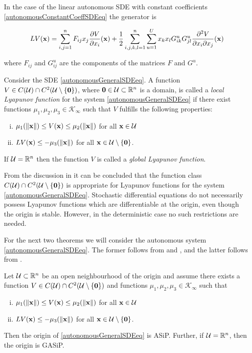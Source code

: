 \documentclass[a4paper,12pt,twoside,BCOR=10mm]{scrbook}
\begin{document}
In the case of the linear autonomous SDE with constant coefficients \eqref{autonomousConstantCoeffSDEeq} the generator is

\begin{align}
    LV(\mathbf{x}) = \sum\limits_{i,j = 1}^nF_{ij}x_j\frac{\partial V}{\partial x_i}(\mathbf{x}) + \frac{1}{2}\sum\limits_{i,j,k,l = 1}^n\sum\limits_{u = 1}^Ux_k x_l G_{ik}^u G_{jl}^u \frac{\partial^2 V}{\partial x_i \partial x_j}(\mathbf{x})
\end{align}

where $F_{ij}$ and $G_{ij}^u$ are the components of the matrices $F$ and $G^u$.

\begin{definition}
    Consider the SDE \eqref{autonomousGeneralSDEeq}. A function $V\in C(\mathcal{U})\cap C^2(\mathcal{U}\setminus \{\mathbf{0}\})$, where $\mathbf{0} \in \mathcal{U} \subset \mathbb{R}^{n}$ is a domain, is called a \textit{local Lyapunov function} for the system \eqref{autonomousGeneralSDEeq} if there exist functions $\mu_1, \mu_2, \mu_3 \in \mathcal{K}_\infty$ such that $V$ fulfills the following properties:
    \begin{enumerate}[i)]
        \item $\mu_1(\left\lVert\mathbf{x}\right\rVert) \leq V(\mathbf{x}) \leq \mu_2(\left\lVert\mathbf{x}\right\rVert)$ for all $\mathbf{x}\in \mathcal{U}$
        \item $LV(\mathbf{x}) \leq -\mu_3(\left\lVert\mathbf{x}\right\rVert)$ for all $\mathbf{x} \in \mathcal{U}\setminus \{\mathbf{0}\}$.
    \end{enumerate}
    If $\mathcal{U} = \mathbb{R}^{n}$ then the function $V$ is called a \textit{global Lyapunov function}.
\end{definition}

From the discussion in \citep[p. 146]{sdestab2012khaminskii} it can be concluded that the function class $C(\mathcal{U})\cap C^2(\mathcal{U}\setminus \{\mathbf{0}\})$ is appropriate for Lyapunov functions for the system \eqref{autonomousGeneralSDEeq}. Stochastic differential equations do not necessarily possess Lyapunov functions which are differentiable at the origin, even though the origin is stable. However, in the deterministic case no such restrictions are needed.
 
For the next two theorems we will consider the autonomous system \eqref{autonomousGeneralSDEeq}. The former follows from \citep[Corollary 5.11]{sdestab2012khaminskii} and \citep[Theorem 5.8]{sdestab2012khaminskii}, and the latter follows from \citep[Theorem 5.11]{sdestab2012khaminskii}.

\begin{theorem}
Let $\mathcal{U} \subset \mathbb{R}^{n}$ be an open neighbourhood of the origin and assume there exists a function $V\in C(\mathcal{U})\cap C^2(\mathcal{U}\setminus \{\mathbf{0}\})$ and functions $\mu_1, \mu_2, \mu_3 \in \mathcal{K}_\infty$ such that
\begin{enumerate} [i)]
    \item $\mu_1(\left\lVert\mathbf{x}\right\rVert) \leq V(\mathbf{x}) \leq \mu_2(\left\lVert\mathbf{x}\right\rVert)$ for all $\mathbf{x} \in \mathcal{U}$
    \item $LV(\mathbf{x}) \leq -\mu_3(\left\lVert\mathbf{x}\right\rVert)$ for all $\mathbf{x}\in \mathcal{U}\setminus \{\mathbf{0}\}$.
\end{enumerate}
Then the origin of \eqref{autonomousGeneralSDEeq} is ASiP. Further, if $\mathcal{U} = \mathbb{R}^{n}$, then the origin is GASiP.
\end{theorem}
\end{document}
